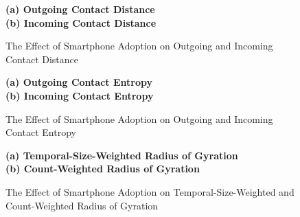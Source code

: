 \begin{figure}[ht!]
\centering
\caption{The Effect of Smartphone Adoption on Outgoing and Incoming Contact Distance}
\vspace{0.3cm}


\textbf{(a) Outgoing Contact Distance}\\


\vspace{0.3cm}
\textbf{(b) Incoming Contact Distance}\\


\label{fig:effect_of_smartphone_adoption_on_incoming_contact_distance}
\end{figure}


\begin{figure}[ht!]
\centering
\caption{The Effect of Smartphone Adoption on Outgoing and Incoming Contact Entropy}
\vspace{0.3cm}

\textbf{(a) Outgoing Contact Entropy}\\


\vspace{0.3cm}
\textbf{(b) Incoming Contact Entropy}\\


\label{fig:effect_of_smartphone_adoption_on_outgoing_incoming_contact_entropy}
\end{figure}


\begin{figure}[ht!]
\centering
\caption{The Effect of Smartphone Adoption on Temporal-Size-Weighted and Count-Weighted Radius of Gyration}
\vspace{0.3cm}

\textbf{(a) Temporal-Size-Weighted Radius of Gyration}\\


\vspace{0.3cm}
\textbf{(b) Count-Weighted Radius of Gyration}\\


\label{fig:effect_of_smartphone_adoption_on_temporal_size_weighted_count_weighted_radius_of_gyration}
\end{figure}


